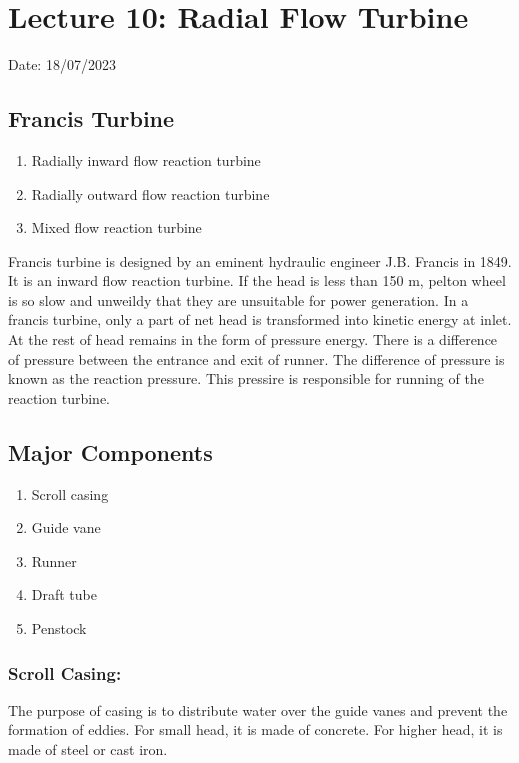 \documentclass{article}
\begin{document}
\section{Lecture 10: Radial Flow Turbine}
\hfill Date: 18/07/2023

\subsection*{Francis Turbine}

\begin{multicols*}{2}
  

\begin{enumerate}
  \item Radially inward flow reaction turbine 
  \item Radially outward flow reaction turbine 
  \item Mixed flow reaction turbine 
\end{enumerate}

Francis turbine is designed by an eminent hydraulic engineer J.B. Francis in 1849. It is an inward flow reaction turbine. If the head is less than 150 m, pelton wheel is so slow and unweildy that they are unsuitable for power generation. In a francis turbine, only a part of net head is transformed into kinetic energy at inlet. At the rest of head remains in the form of pressure energy. There is a difference of pressure between the entrance and exit of runner. The difference of pressure is known as the reaction pressure. This pressire is responsible for running of the reaction turbine. 

\subsection*{Major Components}
\begin{enumerate}
  \item Scroll casing 
  \item Guide vane 
  \item Runner 
  \item Draft tube 
  \item Penstock 
\end{enumerate}

\subsubsection*{Scroll Casing:}
The purpose of casing is to distribute water over the guide vanes and prevent the formation of eddies. For small head, it is made of concrete. For higher head, it is made of steel or cast iron. 


\end{multicols*}
\end{document}
